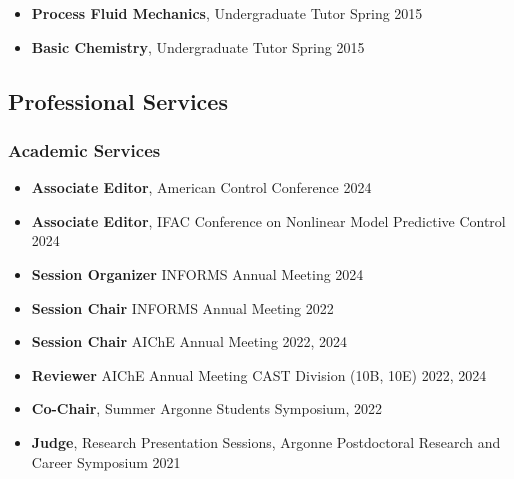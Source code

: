 \documentclass[letterpaper, 11pt]{article}
\begin{document}
\begin{itemize}[leftmargin=*]
\begin{itemize}[leftmargin=*,itemsep=0pt]
  \item[] {\bf Process Fluid Mechanics}, Undergraduate Tutor \hfill Spring 2015
  \item[] {\bf Basic Chemistry}, Undergraduate Tutor \hfill Spring 2015
  \end{itemize}
\end{itemize}


\subsection*{Professional Services}
\subsubsection*{Academic Services}
\begin{itemize}[leftmargin=*,itemsep=-1pt]
  \item[] {\bf Associate Editor}, American Control Conference \hfill 2024
  \item[] {\bf Associate Editor}, IFAC Conference on Nonlinear Model Predictive Control \hfill 2024
\item[] {\bf Session Organizer} INFORMS Annual Meeting \hfill 2024
\item[] {\bf Session Chair} INFORMS Annual Meeting \hfill 2022
\item[] {\bf Session Chair} AIChE Annual Meeting \hfill 2022, 2024
\item[] {\bf Reviewer} AIChE Annual Meeting CAST Division (10B, 10E) \hfill 2022, 2024
\item[] {\bf Co-Chair}, Summer Argonne Students Symposium, \hfill 2022
\item[] {\bf Judge}, Research Presentation Sessions, Argonne Postdoctoral Research and Career Symposium \hfill 2021
\end{itemize}
\end{document}
